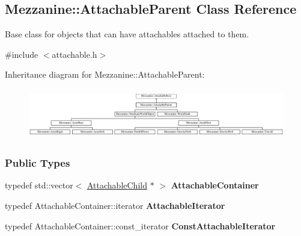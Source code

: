 \hypertarget{classMezzanine_1_1AttachableParent}{
\subsection{Mezzanine::AttachableParent Class Reference}
\label{classMezzanine_1_1AttachableParent}
}


Base class for objects that can have attachables attached to them.  




{\ttfamily \#include $<$attachable.h$>$}

Inheritance diagram for Mezzanine::AttachableParent:\begin{figure}[H]
\begin{center}
\leavevmode
\includegraphics[height=2.211690cm]{classMezzanine_1_1AttachableParent}
\end{center}
\end{figure}
\subsubsection*{Public Types}
\begin{DoxyCompactItemize}
\item 
\hypertarget{classMezzanine_1_1AttachableParent_a6e9c08040897d349a302ff06f647168a}{
typedef std::vector$<$ \hyperlink{classMezzanine_1_1AttachableChild}{AttachableChild} $\ast$ $>$ {\bfseries AttachableContainer}}
\label{classMezzanine_1_1AttachableParent_a6e9c08040897d349a302ff06f647168a}

\item 
\hypertarget{classMezzanine_1_1AttachableParent_a29dc368ae43bb6544304c2fadadac55e}{
typedef AttachableContainer::iterator {\bfseries AttachableIterator}}
\label{classMezzanine_1_1AttachableParent_a29dc368ae43bb6544304c2fadadac55e}

\item 
\hypertarget{classMezzanine_1_1AttachableParent_a7f75a92904328d5f68362f4e3b148934}{
typedef AttachableContainer::const\_\-iterator {\bfseries ConstAttachableIterator}}
\label{classMezzanine_1_1AttachableParent_a7f75a92904328d5f68362f4e3b148934}

\end{DoxyCompactItemize}
